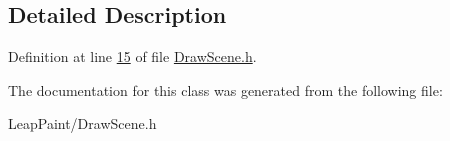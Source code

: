 \subsection{Detailed Description}


Definition at line \hyperlink{_draw_scene_8h_source_l00015}{15} of file \hyperlink{_draw_scene_8h_source}{Draw\-Scene.\-h}.



The documentation for this class was generated from the following file\-:\begin{DoxyCompactItemize}
\item 
Leap\-Paint/Draw\-Scene.\-h\end{DoxyCompactItemize}
